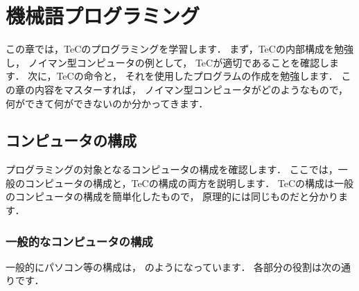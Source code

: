 \renewcommand{\myincludegraphics}[2]{\texttt{[image: chap5/\#1]}}

\chapter{機械語プログラミング\label{prog1}}

この章では，TeCのプログラミングを学習します．
まず，TeCの内部構成を勉強し，
ノイマン型コンピュータの例として，
TeCが適切であることを確認します．
次に，TeCの命令と，
それを使用したプログラムの作成を勉強します．
この章の内容をマスターすれば，
ノイマン型コンピュータがどのようなもので，
何ができて何ができないのか分かってきます．

\section{コンピュータの構成}

プログラミングの対象となるコンピュータの構成を確認します．
ここでは，一般のコンピュータの構成と，TeCの構成の両方を説明します．
TeCの構成は一般のコンピュータの構成を簡単化したもので，
原理的には同じものだと分かります．

\subsection{一般的なコンピュータの構成}

一般的にパソコン等の構成は，
のようになっています．
各部分の役割は次の通りです．


